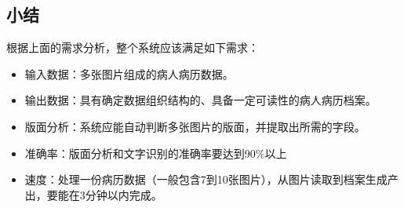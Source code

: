 \subsection{小结}
根据上面的需求分析，整个系统应该满足如下需求：
\begin{itemize}
	\item 输入数据：多张图片组成的病人病历数据。
	\item 输出数据：具有确定数据组织结构的、具备一定可读性的病人病历档案。
	\item 版面分析：系统应能自动判断多张图片的版面，并提取出所需的字段。
	\item 准确率：版面分析和文字识别的准确率要达到90\%以上
	\item 速度：处理一份病历数据（一般包含7到10张图片），从图片读取到档案生成产出，要能在3分钟以内完成。
\end{itemize}